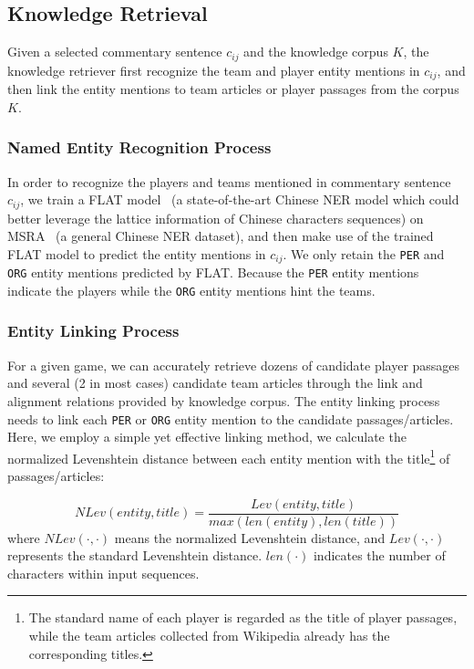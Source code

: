 \subsection{Knowledge Retrieval}
\label{sec:retriever}
Given a selected commentary sentence $c_{ij}$ and the knowledge corpus $K$, the knowledge retriever first recognize the team and player entity mentions in $c_{ij}$, and then link the entity mentions to team articles or player passages from the corpus $K$.

\subsubsection{Named Entity Recognition Process}
In order to recognize the players and teams mentioned in commentary sentence $c_{ij}$, we train a FLAT model~\cite{Li2020FLATCN} (a state-of-the-art Chinese NER model which could better leverage the lattice information of Chinese characters sequences) on MSRA~\cite{Levow2006TheTI} (a general Chinese NER dataset), and then make use of the trained FLAT model to predict the entity mentions in $c_{ij}$. We only retain the \texttt{PER} and \texttt{ORG} entity mentions predicted by FLAT.
Because the \texttt{PER} entity mentions indicate the players while the \texttt{ORG} entity mentions hint the teams.

\subsubsection{Entity Linking Process}
For a given game, we can accurately retrieve dozens of candidate player passages and several (2 in most cases) candidate team articles through the link and alignment relations provided by knowledge corpus.
The entity linking process needs to link each \texttt{PER} or \texttt{ORG} entity mention to the candidate passages/articles. Here, we employ a simple yet effective linking method, we calculate the normalized Levenshtein distance between each entity mention with the title\footnote{The standard name of each player is regarded as the title of player passages, while the team articles collected from Wikipedia already has the corresponding titles.} of passages/articles:

\begin{equation}
\label{levenshtein}
NLev(entity,title)=\frac{Lev(entity,title)}{max(len(entity),len(title))}
\end{equation}
where $NLev(\cdot,\cdot)$ means the normalized Levenshtein distance, and $Lev(\cdot,\cdot)$ represents the standard Levenshtein distance. $len(\cdot)$ indicates the number of characters within input sequences. 

